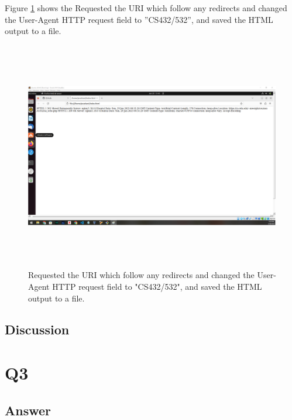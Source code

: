 \documentclass[12pt]{article}
\begin{document}
Figure \ref{fig:Q2c-3} shows the Requested the URI which follow any redirects and changed the User-Agent HTTP request field to ”CS432/532”, and saved the HTML output to a file.


\begin{figure}[h!]
    \centering
    \includegraphics[trim=0 0 0 0, clip, width=\textwidth,height=10cm] {Q2c-3.png}
    \caption{Requested the URI which follow any redirects and changed the User-Agent HTTP request field to "CS432/532", and saved the HTML output to a file.}
    \label{fig:Q2c-3}
\end{figure}

\subsection*{Discussion}

\section*{Q3}

\subsection*{Answer}
\end{document}
